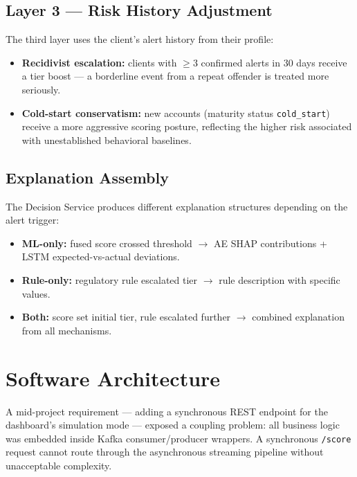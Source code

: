 \subsection{Layer 3 --- Risk History Adjustment}

The third layer uses the client's alert history from their profile:

\begin{itemize}[leftmargin=2cm]
    \item \textbf{Recidivist escalation:} clients with $\geq$3 confirmed alerts in
          30 days receive a tier boost --- a borderline event from a repeat offender
          is treated more seriously.
    \item \textbf{Cold-start conservatism:} new accounts (maturity status
          \texttt{cold\_start}) receive a more aggressive scoring posture, reflecting
          the higher risk associated with unestablished behavioral baselines.
\end{itemize}

\subsection{Explanation Assembly}

The Decision Service produces different explanation structures depending on the
alert trigger:

\begin{itemize}[leftmargin=2cm]
    \item \textbf{ML-only:} fused score crossed threshold $\rightarrow$ AE SHAP
          contributions + LSTM expected-vs-actual deviations.
    \item \textbf{Rule-only:} regulatory rule escalated tier $\rightarrow$ rule
          description with specific values.
    \item \textbf{Both:} score set initial tier, rule escalated further $\rightarrow$
          combined explanation from all mechanisms.
\end{itemize}

\section{Software Architecture}
\label{sec:software-architecture}

A mid-project requirement --- adding a synchronous REST endpoint for the dashboard's
simulation mode --- exposed a coupling problem: all business logic was embedded inside
Kafka consumer/producer wrappers. A synchronous \texttt{/score} request cannot route
through the asynchronous streaming pipeline without unacceptable complexity.

